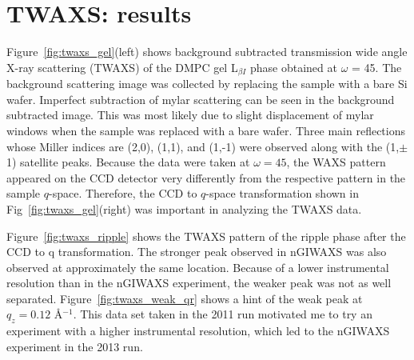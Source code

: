 


\newpage
\section{TWAXS: results}\label{sec:TWAXS_results}
Figure~\ref{fig:twaxs_gel}(left) shows background subtracted transmission wide
angle X-ray scattering (TWAXS) of the DMPC gel L$_{\beta I}$ phase obtained at 
$\omega$ = 45\textdegree.
The background scattering image was collected by replacing 
the sample with a bare Si wafer. Imperfect subtraction of mylar scattering 
can be seen in the background subtracted image. 
This was most likely due to slight displacement of mylar windows
when the sample was replaced with a bare wafer. Three main reflections whose Miller indices 
are (2,0), (1,1), and (1,-1) were observed along with the (1,$\pm$1) satellite 
peaks.
Because the data were taken at $\omega=45$\textdegree, the WAXS pattern 
appeared on the CCD detector very differently from the respective pattern
in the sample $q$-space. 
Therefore, the CCD to $q$-space transformation shown in 
Fig~\ref{fig:twaxs_gel}(right) was important in analyzing the TWAXS data. 

Figure~\ref{fig:twaxs_ripple} shows the TWAXS pattern of the ripple phase 
after the CCD to q transformation. The stronger
peak observed in nGIWAXS was also observed at approximately the same location.
Because of a lower instrumental resolution than in the nGIWAXS experiment,
the weaker peak was not as well separated. Figure~\ref{fig:twaxs_weak_qr} shows
a hint of the weak peak at $q_z=0.12$ \AA$^{-1}$. This
data set taken in the 2011 run motivated me to try an experiment
with a higher instrumental resolution, which led to the nGIWAXS experiment
in the 2013 run. 

